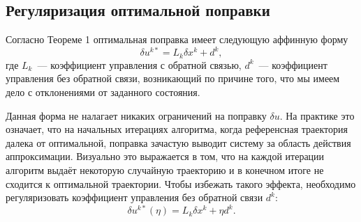 \documentclass[../../doc.tex]{subfiles}
\begin{document}
    \subsection{Регуляризация оптимальной поправки}

    Согласно Теореме 1 оптимальная поправка имеет следующую аффинную форму
    \begin{equation*}
        \delta u^{k*} = L_k \delta x^k + d^k,
    \end{equation*}
    где $L_k$~--- коэффициент управления с обратной связью, $d^k$~--- коэффициент управления без обратной связи, возникающий по причине того, что мы имеем дело с отклонениями от заданного состояния.

    Данная форма не налагает никаких ограничений на поправку $\delta u$.
    На практике это означает,
        что на начальных итерациях алгоритма,
        когда референсная траектория далека от оптимальной,
        поправка зачастую выводит систему за область действия аппроксимации.
    Визуально это выражается в том, что на каждой итерации алгоритм выдаёт некоторую случайную траекторию и в конечном итоге не сходится к оптимальной траектории.
    Чтобы избежать такого эффекта, необходимо регуляризовать коэффициент управления без обратной связи $d^k$:
    \begin{equation*}
        \delta u^{k*}(\eta) = L_k \delta x^k + \eta d^k.
    \end{equation*}
\end{document}
